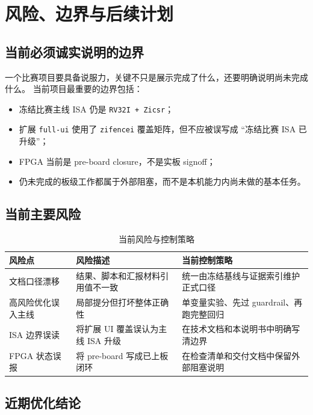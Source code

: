 \section{风险、边界与后续计划}

\subsection{当前必须诚实说明的边界}

一个比赛项目要具备说服力，关键不只是展示完成了什么，还要明确说明尚未完成什么。
当前项目最重要的边界包括：

\begin{itemize}
    \item 冻结比赛主线 ISA 仍是 \texttt{RV32I + Zicsr}；
    \item 扩展 \texttt{full-ui} 使用了 \texttt{zifencei} 覆盖矩阵，但不应被误写成
    ``冻结比赛 ISA 已升级''；
    \item FPGA 当前是 pre-board closure，不是实板 signoff；
    \item 仍未完成的板级工作都属于外部阻塞，而不是本机能力内尚未做的基本任务。
\end{itemize}

\subsection{当前主要风险}

\begin{table}[H]
    \centering
    \caption{当前风险与控制策略}
    \begin{tabular}{p{} p{} p{}}
        \toprule
        风险点 & 风险描述 & 当前控制策略 \\
        \midrule
        文档口径漂移 & 结果、脚本和汇报材料引用值不一致 & 统一由冻结基线与证据索引维护正式口径 \\
        高风险优化误入主线 & 局部提分但打坏整体正确性 & 单变量实验、先过 guardrail、再跑完整回归 \\
        ISA 边界误读 & 将扩展 UI 覆盖误认为主线 ISA 升级 & 在技术文档和本说明书中明确写清边界 \\
        FPGA 状态误报 & 将 pre-board 写成已上板闭环 & 在检查清单和交付文档中保留外部阻塞说明 \\
        \bottomrule
    \end{tabular}
\end{table}

\subsection{近期优化结论}

